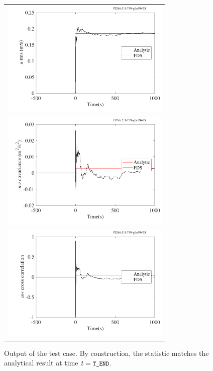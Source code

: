 \documentclass[11pt]{book}
\begin{document}
\begin{figure}[h!]
\centering
\begin{tabular}{l}
\includegraphics[width=3.2in]{SCRIPT_FIGURES/rms_cov_corr_rms}\\
\includegraphics[width=3.2in]{SCRIPT_FIGURES/rms_cov_corr_cov} \\
\includegraphics[width=3.2in]{SCRIPT_FIGURES/rms_cov_corr_corr}
\end{tabular}
\caption[Sample case ]{Output of the  test case.  By construction, the statistic matches the analytical result at time $t = \mbox{\tt\small T\_END}$.}
\label{rms_cov_corr_plots}
\end{figure}

\clearpage




\newpage


\end{document}
